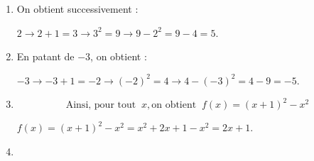 
\medskip

%

\smallskip

\begin{enumerate}
\item %
On obtient successivement :

$2 \to 2 + 1 = 3 \to 3^2 = 9 \to 9 - 2^2 = 9 - 4 = 5$.
\item %
En patant de $- 3$, on obtient :

$- 3 \to - 3 + 1 = - 2 \to (- 2)^2 = 4 \to 4 - (- 3)^2 = 4 - 9 = - 5$.
\item %

\[\text{Ainsi, pour tout }\:x, \text{on obtient } \:f(x) = (x + 1)^2 - x^2\]

$f(x) = (x + 1)^2 - x^2 = x^2 + 2x + 1 - x^2 = 2x + 1$.
 \item %




\end{enumerate}
